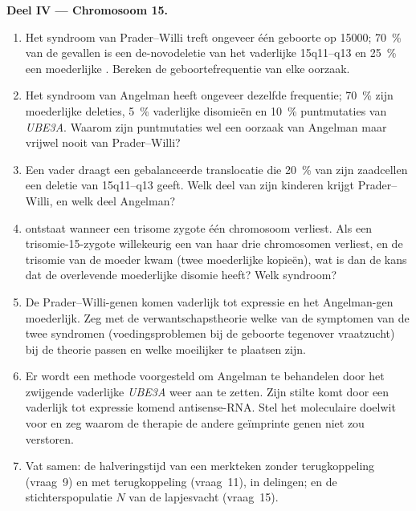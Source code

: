 \begin{problem}
\medskip
\noindent\textbf{Deel IV --- Chromosoom 15.}
\begin{enumerate}[resume]
  \item Het syndroom van Prader--Willi treft ongeveer één geboorte op
        \num{15000}; \qty{70}{\%} van de gevallen is een de-novodeletie
        van het vaderlijke 15q11--q13 en \qty{25}{\%} een moederlijke
        . Bereken de geboortefrequentie van elke
        oorzaak.
  \item Het syndroom van Angelman heeft ongeveer dezelfde frequentie;
        \qty{70}{\%} zijn moederlijke deleties, \qty{5}{\%} vaderlijke
        disomieën en \qty{10}{\%} puntmutaties van \emph{UBE3A}. Waarom
        zijn puntmutaties wel een oorzaak van Angelman maar vrijwel
        nooit van Prader--Willi?
  \item Een vader draagt een gebalanceerde translocatie die
        \qty{20}{\%} van zijn zaadcellen een deletie van 15q11--q13
        geeft. Welk deel van zijn kinderen krijgt Prader--Willi, en
        welk deel Angelman?
  \item {} ontstaat wanneer een trisome zygote één
        chromosoom verliest. Als een trisomie-15-zygote willekeurig een
        van haar drie chromosomen verliest, en de trisomie van de
        moeder kwam (twee moederlijke kopieën), wat is dan de kans dat
        de overlevende moederlijke disomie heeft? Welk syndroom?
  \item De Prader--Willi-genen komen vaderlijk tot expressie en het
        Angelman-gen moederlijk. Zeg met de verwantschapstheorie welke
        van de symptomen van de twee syndromen (voedingsproblemen bij
        de geboorte tegenover vraatzucht) bij de theorie passen en
        welke moeilijker te plaatsen zijn.
  \item Er wordt een methode voorgesteld om Angelman te behandelen door
        het zwijgende vaderlijke \emph{UBE3A} weer aan te zetten. Zijn
        stilte komt door een vaderlijk tot expressie komend
        antisense-RNA. Stel het moleculaire doelwit voor en zeg waarom
        de therapie de andere geïmprinte genen niet zou verstoren.
  \item Vat samen: de halveringstijd van een merkteken zonder
        terugkoppeling (vraag~9) en met terugkoppeling (vraag~11), in
        delingen; en de stichterspopulatie $N$ van de lapjesvacht
        (vraag~15).
\end{enumerate}
\end{problem}
